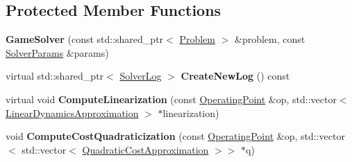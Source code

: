 \subsection*{Protected Member Functions}
\begin{DoxyCompactItemize}
\item 
{\bfseries Game\+Solver} (const std\+::shared\+\_\+ptr$<$ \hyperlink{classilqgames_1_1_problem}{Problem} $>$ \&problem, const \hyperlink{structilqgames_1_1_solver_params}{Solver\+Params} \&params)\hypertarget{classilqgames_1_1_game_solver_af7aed039cfd1c7dd88c40ff710caf97a}{}\label{classilqgames_1_1_game_solver_af7aed039cfd1c7dd88c40ff710caf97a}

\item 
virtual std\+::shared\+\_\+ptr$<$ \hyperlink{classilqgames_1_1_solver_log}{Solver\+Log} $>$ {\bfseries Create\+New\+Log} () const \hypertarget{classilqgames_1_1_game_solver_add427a4fe7b7d3d0e2dbb4a47105c765}{}\label{classilqgames_1_1_game_solver_add427a4fe7b7d3d0e2dbb4a47105c765}

\item 
virtual void {\bfseries Compute\+Linearization} (const \hyperlink{structilqgames_1_1_operating_point}{Operating\+Point} \&op, std\+::vector$<$ \hyperlink{structilqgames_1_1_linear_dynamics_approximation}{Linear\+Dynamics\+Approximation} $>$ $\ast$linearization)\hypertarget{classilqgames_1_1_game_solver_a02d8f01b0742df2c0f288e8519c58282}{}\label{classilqgames_1_1_game_solver_a02d8f01b0742df2c0f288e8519c58282}

\item 
void {\bfseries Compute\+Cost\+Quadraticization} (const \hyperlink{structilqgames_1_1_operating_point}{Operating\+Point} \&op, std\+::vector$<$ std\+::vector$<$ \hyperlink{structilqgames_1_1_quadratic_cost_approximation}{Quadratic\+Cost\+Approximation} $>$$>$ $\ast$q)\hypertarget{classilqgames_1_1_game_solver_aba8d0d2965cb5140809327e765b1898d}{}\label{classilqgames_1_1_game_solver_aba8d0d2965cb5140809327e765b1898d}

\end{DoxyCompactItemize}
